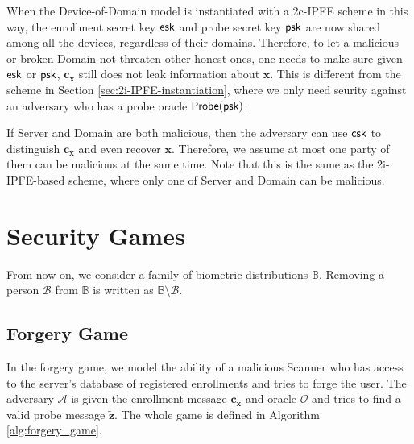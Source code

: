 When the Device-of-Domain model is instantiated with a 2c-IPFE scheme in this way, the enrollment secret key ${\sf esk}$ and probe secret key ${\sf psk}$ are now shared among all the devices, regardless of their domains. Therefore, to let a malicious or broken {\sf Domain} not threaten other honest ones, one needs to make sure given ${\sf esk}$ or ${\sf psk}$, $\mathbf{c_x}$ still does not leak information about $\mathbf{x}$. This is different from the scheme in Section \ref{sec:2i-IPFE-instantiation}, where we only need seurity against an adversary who has a probe oracle ${\sf Probe}(\sf psk)$.

If {\sf Server} and {\sf Domain} are both malicious, then the adversary can use ${\sf csk}$ to distinguish $\mathbf{c_x}$ and even recover $\mathbf{x}$. Therefore, we assume at most one party of them can be malicious at the same time. Note that this is the same as the 2i-IPFE-based scheme, where only one of {\sf Server} and {\sf Domain} can be malicious.



\section{Security Games}

From now on, we consider a family of biometric distributions $\mathbb{B}$. Removing a person $\mathcal{B}$ from $\mathbb{B}$ is written as $\mathbb{B} \setminus \mathcal{B}$.

\subsection{Forgery Game}
\label{sec:forgery_game}

In the forgery game, we model the ability of a malicious {\sf Scanner} who has access to the server's database of registered enrollments and tries to forge the user. The adversary $\mathcal{A}$ is given the enrollment message $\mathbf{c_x}$ and oracle $\mathcal{O}$ and tries to find a valid probe message $\mathbf{\tilde{z}}$. The whole game is defined in Algorithm \ref{alg:forgery_game}.


